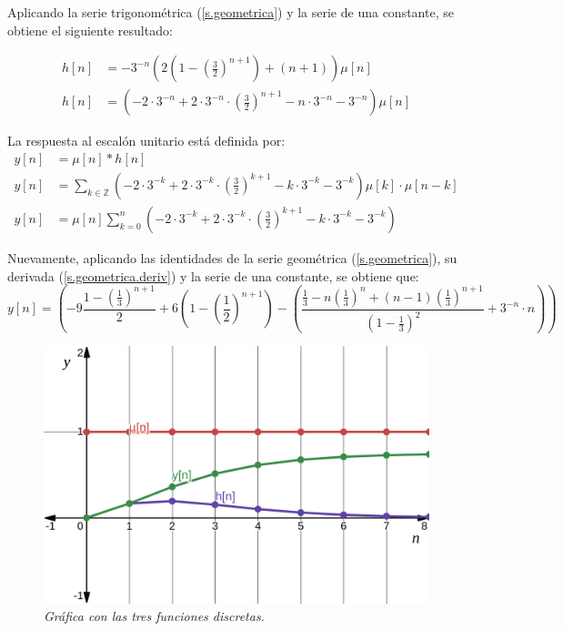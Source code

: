 \documentclass[a4paper,12pt]{report}
\begin{document}
\begin{enumerate}[label=\alph*), left=0pt]
    Aplicando la serie trigonométrica (\ref{s.geometrica}) y la serie de una constante, se obtiene el siguiente
    resultado:

    \begin{align*}
      h[n] &= -3^{-n} \left(2\left(1 - \left(\frac{3}{2}\right)^{n+1} \right) + (n+1)\right) \mu[n]\\[6pt]
      h[n] &= \left(-2 \cdot 3^{-n} + 2 \cdot 3^{-n} \cdot \left(\frac{3}{2}\right)^{n+1} -
        n \cdot 3^{-n} - 3^{-n}\right)\mu[n]
    \end{align*}

    La respuesta al escalón unitario está definida por:
    \begin{align*}
      y[n] &= \mu[n] * h[n]\\[6pt]
      y[n] &= \sum_{k \in \mathbb{Z}} \left(-2 \cdot 3^{-k} + 2 \cdot 3^{-k} \cdot \left(\frac{3}{2}\right)^{k+1} -
        k \cdot 3^{-k} - 3^{-k}\right)\mu[k] \cdot \mu[n-k]\\[6pt]
      y[n] &= \mu[n] \sum_{k=0}^n \left(-2 \cdot 3^{-k} + 2 \cdot 3^{-k} \cdot \left(\frac{3}{2}\right)^{k+1} -
        k \cdot 3^{-k} - 3^{-k}\right)
    \end{align*}

    Nuevamente, aplicando las identidades de la serie geométrica (\ref{s.geometrica}), su derivada (\ref{s.geometrica.deriv})
    y la serie de una constante, se obtiene que:
    \begin{equation*}
      y[n] = \left(-9 \frac{1-\left(\frac{1}{3}\right)^{n+1}}{2} + 6 \left(1 - \left(\frac{1}{2}\right)^{n+1}\right) -
        \left(\frac{\frac{1}{3} - n\left(\frac{1}{3}\right)^{n} + (n-1) \left(\frac{1}{3}\right)^{n+1}}{\left(1-\frac{1}{3}\right)^{2}}+3^{-n}\cdot n\right)\right)
    \end{equation*}

    \begin{figure}[H]
      \centering
      \begin{minipage}{0.55\textwidth}
        \centering
        \includegraphics[width=1\textwidth]{./images/ej2.2.png}
        \textit{Gráfica con las tres funciones discretas.}
      \end{minipage}
    \end{figure}

\end{enumerate}
\end{document}
